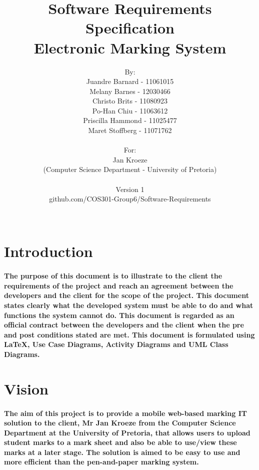 \documentclass[12pt]{article}
\begin{document}
\title{Software Requirements Specification\\
Electronic Marking System}
\author{By: \\ Juandre Barnard - 11061015 \\ Melany Barnes - 12030466 \\ Christo Brits - 11080923 \\ Po-Han Chiu - 11063612 \\ Priscilla Hammond - 11025477 \\ Maret Stoffberg - 11071762 \\ \\ For: \\ Jan Kroeze \\ (Computer Science Department - University of Pretoria) \\ \\ Version 1 \\ github.com/COS301-Group6/Software-Requirements \\ \\}
  \maketitle   \pagebreak
  \tableofcontents
  \pagebreak
  \section{Introduction}
  \paragraph*{The purpose of this document is to illustrate to the client the requirements of the project and reach an agreement between the developers and the client for the scope of the project. This document states clearly what the developed system must be able to do and what functions the system cannot do. This document is regarded as an official contract between the developers and the client when the pre and post conditions stated are met. This document is formulated using LaTeX, Use Case Diagrams, Activity Diagrams and UML Class Diagrams.}
  \section{Vision}
  \paragraph*{The aim of this project is to provide a mobile web-based marking IT solution to the client, Mr Jan Kroeze from the Computer Science Department at the University of Pretoria, that allows users to upload student marks to a mark sheet and also be able to use/view these marks at a later stage. The solution is aimed to be easy to use and more efficient than the pen-and-paper marking system.}
\end{document}
